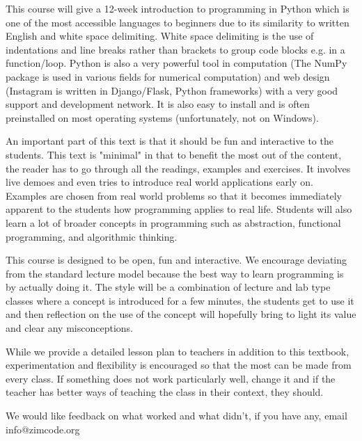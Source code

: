 This course will give a 12-week introduction to programming in Python which is one of the most accessible languages to beginners due to its similarity to written English and white space delimiting. White space delimiting is the use of indentations and line 
breaks rather than brackets to group code blocks e.g. in a function/loop. Python is also a very powerful tool in computation (The NumPy package is used in various fields for numerical computation) and web design (Instagram is written in Django/Flask, Python frameworks) 
with a very good support and development network. It is also easy to install and is often preinstalled on most operating systems (unfortunately, not on Windows).

An important part of this text is that it should be fun and interactive to the students. This text is "minimal" in that to benefit the most out of the content, the reader has to go through all the readings, examples and exercises. It involves live demoes and even tries to introduce real world applications early on. Examples are chosen from real world problems so that it becomes immediately apparent to the students how programming applies to real life.
Students will also learn a lot of broader concepts in programming such as abstraction, functional programming, and algorithmic thinking.

This course is designed to be open, fun and interactive. We encourage deviating from the standard lecture model because the best way to learn programming is by actually doing it. The style will be a combination of lecture and lab type classes where a concept is introduced for 
a few minutes, the students get to use it and then reflection on the use of the concept will hopefully bring to light its value and clear any misconceptions. 

While we provide a detailed lesson plan to teachers in addition to this textbook, experimentation and flexibility is encouraged so that the most can be made from every class. If something does not work particularly well, change it and if the teacher has better ways of teaching the class in their context, they should. 

We would like feedback on what worked and what didn’t, if you have any, email info@zimcode.org
